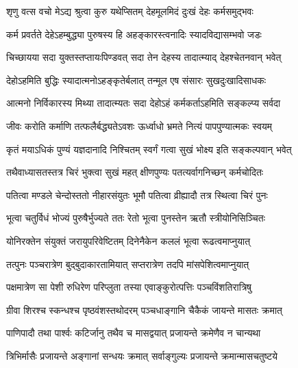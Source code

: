 


\addtocounter{shlokacount}{11}

\twolineshloka
{शृणु वत्स वचो मेऽद्य श्रुत्वा कुरु यथेप्सितम्}
{देहमूलमिदं दुःखं देहः कर्मसमुद्भवः} %

\twolineshloka
{कर्म प्रवर्तते देहेऽहम्बुद्ध्या पुरुषस्य हि}
{अहङ्कारस्त्वनादिः स्यादविद्यासम्भवो जडः} %

\twolineshloka
{चिच्छायया सदा युक्तस्तप्तायःपिण्डवत् सदा}
{तेन देहस्य तादात्म्याद् देहश्चेतनवान् भवेत्} %

\twolineshloka
{देहोऽहमिति बुद्धिः स्यादात्मनोऽहङ्कृतेर्बलात्}
{तन्मूल एष संसारः सुखदुःखादिसाधकः} %

\twolineshloka
{आत्मनो निर्विकारस्य मिथ्या तादात्म्यतः सदा}
{देहोऽहं कर्मकर्ताऽहमिति सङ्कल्प्य सर्वदा} %

\twolineshloka
{जीवः करोति कर्माणि तत्फलैर्बद्ध्यतेऽवशः}
{ऊर्ध्वाधो भ्रमते नित्यं पापपुण्यात्मकः स्वयम्} %

\twolineshloka
{कृतं मयाऽधिकं पुण्यं यज्ञदानादि निश्चितम्}
{स्वर्गं गत्वा सुखं भोक्ष्य इति सङ्कल्पवान् भवेत्} %

\twolineshloka
{तथैवाध्यासतस्तत्र चिरं भुक्त्वा सुखं महत्}
{क्षीणपुण्यः पतत्यर्वागनिच्छन् कर्मचोदितः} %

\twolineshloka
{पतित्वा मण्डले चेन्दोस्ततो नीहारसंयुतः}
{भूमौ पतित्वा व्रीह्यादौ तत्र स्थित्वा चिरं पुनः} %

\twolineshloka
{भूत्वा चतुर्विधं भोज्यं पुरुषैर्भुज्यते ततः}
{रेतो भूत्वा पुनस्तेन ऋतौ स्त्रीयोनिसिञ्चितः} %

\twolineshloka
{योनिरक्तेन संयुक्तं जरायुपरिवेष्टितम्}
{दिनेनैकेन कललं भूत्वा रूढत्वमाप्नुयात्} %

\twolineshloka
{तत्पुनः पञ्चरात्रेण बुद्बुदाकारतामियात्}
{सप्तरात्रेण तदपि मांसपेशित्वमाप्नुयात्} %

\twolineshloka
{पक्षमात्रेण सा पेशी रुधिरेण परिप्लुता}
{तस्या एवाङ्कुरोत्पत्तिः पञ्चविंशतिरात्रिषु} %

\twolineshloka
{ग्रीवा शिरश्च स्कन्धश्च पृष्ठवंशस्तथोदरम्}
{पञ्चधाङ्गानि चैकैकं जायन्ते मासतः क्रमात्} %

\twolineshloka
{पाणिपादौ तथा पार्श्वः कटिर्जानु तथैव च}
{मासद्वयात् प्रजायन्ते क्रमेणैव न चान्यथा} %

\twolineshloka
{त्रिभिर्मासैः प्रजायन्ते अङ्गानां सन्धयः क्रमात्}
{सर्वाङ्गुल्यः प्रजायन्ते क्रमान्मासचतुष्टये} %


